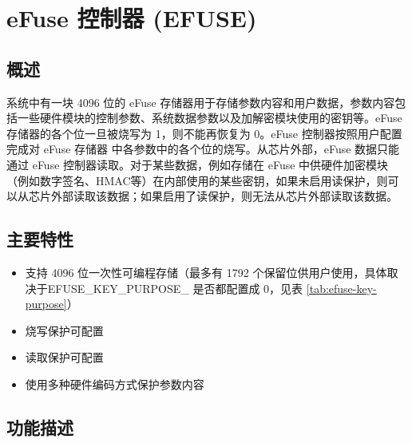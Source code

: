\documentclass[main\_\_CN.tex]{subfiles}
\begin{document}

\ifglobal
\else
    {\let\clearpage\relax \listoftodos}
    {\let\clearpage\relax \listofdonetodos}
    \tableofcontents
\fi




\chapter{eFuse 控制器 (EFUSE)}
\label{mod:efuse}
\hypertarget{efuse}{}


\section{概述}

\chipname{} 系统中有一块 4096 位的 eFuse 存储器用于存储参数内容和用户数据，参数内容包括一些硬件模块的控制参数、系统数据参数以及加解密模块使用的密钥等。eFuse 存储器的各个位一旦被烧写为 1，则不能再恢复为 0。eFuse 控制器按照用户配置完成对 eFuse 存储器 中各参数中的各个位的烧写。从芯片外部，eFuse 数据只能通过 eFuse 控制器读取。对于某些数据，例如存储在 eFuse 中供硬件加密模块（例如数字签名、HMAC等）在内部使用的某些密钥，如果未启用读保护，则可以从芯片外部读取该数据；如果启用了读保护，则无法从芯片外部读取该数据。

\section{主要特性}

\begin{itemize}
    \item 支持 4096 位一次性可编程存储（最多有 1792 个保留位供用户使用，具体取决于EFUSE\_KEY\_PURPOSE\_ 是否都配置成 0，见表 \ref{tab:efuse-key-purpose}）
    \item 烧写保护可配置
    \item 读取保护可配置
    \item 使用多种硬件编码方式保护参数内容
\end{itemize}


\section{功能描述}
\end{document}

